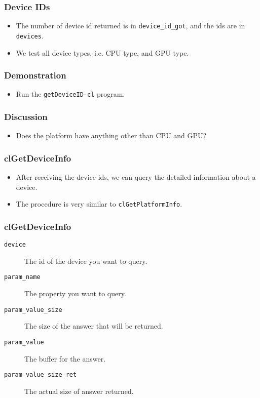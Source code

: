 \documentclass{beamer}
\begin{document}

\begin{frame}
  \frametitle{Device IDs}
  \begin{itemize}
  \item The number of device id returned is in {\tt device\_id\_got},
    and the ids are in {\tt devices}.
  \item We test all device types, i.e. CPU type, and GPU type.
  \end{itemize}
\end{frame}

\begin{frame}
  \frametitle{Demonstration}
  \begin{itemize}
  \item Run the {\tt getDeviceID-cl} program.
  \end{itemize}
\end{frame}

\begin{frame}
  \frametitle{Discussion}
  \begin{itemize}
  \item Does the platform have anything other than CPU and GPU?
  \end{itemize}
\end{frame}

\begin{frame}
  \frametitle{clGetDeviceInfo}
  \begin{itemize}
  \item After receiving the device ids, we can query the detailed
    information about a device.
  \item The procedure is very similar to {\tt clGetPlatformInfo}.
  \end{itemize}
\end{frame}

\begin{frame}
\end{frame}

\begin{frame}
  \frametitle{clGetDeviceInfo}
  \begin{description}
  \item [\tt device] The id of the device you want to query.
  \item [\tt param\_name] The property you want to query.
  \item [\tt param\_value\_size] The size of the answer that will be
    returned.
  \item [\tt param\_value] The buffer for the answer.
  \item [\tt param\_value\_size\_ret] The actual size of answer returned.
  \end{description}
\end{frame}
\end{document}

